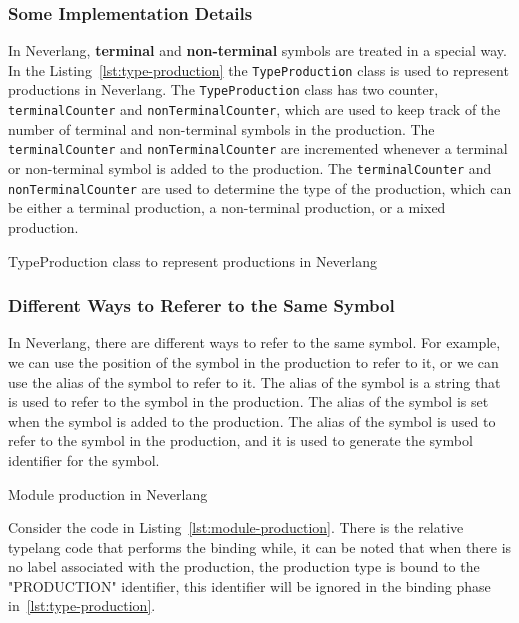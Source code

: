 \subsubsection{Some Implementation Details}\label{sec:neverlang-implementation-details}

In Neverlang, \textbf{terminal} and \textbf{non-terminal} symbols are treated in a special way. In the Listing~\ref{lst:type-production} the \texttt{TypeProduction} class is used to represent productions in Neverlang. The \texttt{TypeProduction} class has two counter, \texttt{terminalCounter} and \texttt{nonTerminalCounter}, which are used to keep track of the number of terminal and non-terminal symbols in the production. The \texttt{terminalCounter} and \texttt{nonTerminalCounter} are incremented whenever a terminal or non-terminal symbol is added to the production. The \texttt{terminalCounter} and \texttt{nonTerminalCounter} are used to determine the type of the production, which can be either a terminal production, a non-terminal production, or a mixed production.

\begin{Listing}
    \centering
    \caption{TypeProduction class to represent productions in Neverlang}
    \label{lst:type-production}
\end{Listing}

\subsubsection{Different Ways to Referer to the Same Symbol}\label{sec:neverlang-different-ways-referer}

In Neverlang, there are different ways to refer to the same symbol. For example, we can use the position of the symbol in the production to refer to it, or we can use the alias of the symbol to refer to it. The alias of the symbol is a string that is used to refer to the symbol in the production. The alias of the symbol is set when the symbol is added to the production. The alias of the symbol is used to refer to the symbol in the production, and it is used to generate the symbol identifier for the symbol.

\begin{Listing}
    \centering
    \caption{Module production in Neverlang}
    \label{lst:module-production}
\end{Listing}

Consider the code in Listing~\ref{lst:module-production}. There is the relative typelang code that performs the binding while, it can be noted that when there is no label associated with the production, the production type is bound to the "PRODUCTION" identifier, this identifier will be ignored in the binding phase in~\ref{lst:type-production}.

